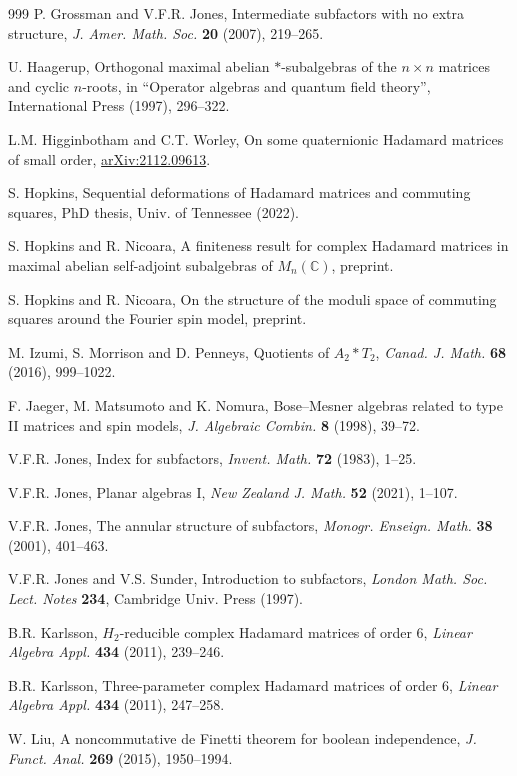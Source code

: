 \documentclass[11pt]{amsart}
\newcommand{\arx}[1]{{\hypersetup{allcolors=black}\href{https://arxiv.org/pdf/#1}{arXiv:#1}}}
\begin{document}
\begin{thebibliography}{999}
 P. Grossman and V.F.R. Jones, Intermediate subfactors with no extra structure, {\em J. Amer. Math. Soc.} {\bf 20} (2007), 219--265.

 U. Haagerup, Orthogonal maximal abelian $*$-subalgebras of the $n\times n$ matrices and cyclic $n$-roots, in ``Operator algebras and quantum field theory'', International Press (1997), 296--322.

 L.M. Higginbotham and C.T. Worley, On some quaternionic Hadamard matrices of small order, \arx{2112.09613}.

 S. Hopkins, Sequential deformations of Hadamard matrices and commuting squares, PhD thesis, Univ. of Tennessee (2022).

 S. Hopkins and R. Nicoara, A finiteness result for complex Hadamard matrices in maximal abelian self-adjoint subalgebras of $M_n(\mathbb C)$, preprint.

 S. Hopkins and R. Nicoara, On the structure of the moduli space of commuting squares around the Fourier spin model, preprint.

 M. Izumi, S. Morrison and D. Penneys, Quotients of $A_2*T_2$, {\em Canad. J. Math.} {\bf 68} (2016), 999--1022.

 F. Jaeger, M. Matsumoto and K. Nomura, Bose--Mesner algebras related to type II matrices and spin models, {\em J. Algebraic Combin.} {\bf 8} (1998), 39--72.

 V.F.R. Jones, Index for subfactors, {\em Invent. Math.} {\bf 72} (1983), 1--25.

 V.F.R. Jones, Planar algebras I, {\em New Zealand J. Math.} {\bf 52} (2021), 1--107.

 V.F.R. Jones, The annular structure of subfactors, {\em Monogr. Enseign. Math.} {\bf 38} (2001), 401--463.

 V.F.R. Jones and V.S. Sunder, Introduction to subfactors, {\em London Math. Soc. Lect. Notes} {\bf 234}, Cambridge Univ. Press (1997).

 B.R. Karlsson, $H_2$-reducible complex Hadamard matrices of order 6, {\em Linear Algebra Appl.} {\bf 434} (2011), 239--246.

 B.R. Karlsson, Three-parameter complex Hadamard matrices of order 6, {\em Linear Algebra Appl.} {\bf 434} (2011), 247--258.

 W. Liu, A noncommutative de Finetti theorem for boolean independence, {\em J. Funct. Anal.} {\bf 269} (2015), 1950--1994.


\end{thebibliography}
\end{document}
